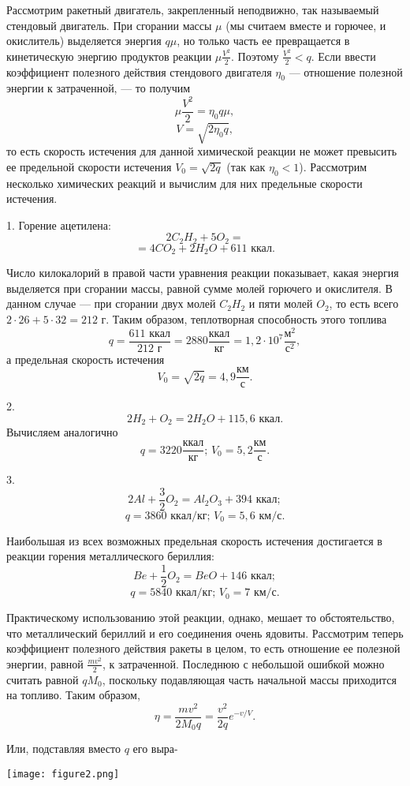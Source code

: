 \documentclass[twocolumn]{article}
\begin{document}
\begin{minipage}[t]{0.48\textwidth}
Рассмотрим ракетный двигатель, закрепленный неподвижно, так называемый стендовый двигатель. При сгорании массы $\mu$ (мы считаем вместе и горючее, и окислитель) выделяется энергия $q\mu$, но только часть ее превращается в кинетическую энергию продуктов реакции $\mu \frac{V^2}{2}$. Поэтому $\frac{V^2}{2} < q$. Если ввести коэффициент полезного действия стендового двигателя $\eta_0$ — отношение полезной энергии к затраченной, — то получим 
\[ \mu \frac{V^2}{2} = \eta_0 q\mu, \] 
\[ V = \sqrt{2\eta_0 q}, \] 
то есть скорость истечения для данной химической реакции не может превысить ее предельной скорости истечения $V_0 = \sqrt{2q}$ (так как $\eta_0 < 1$). Рассмотрим несколько химических реакций и вычислим для них предельные скорости истечения.

1. Горение ацетилена: 
\[ 2C_2H_2 + 5O_2 = \] 
\[ = 4CO_2 + 2H_2O + 611 \text{ ккал}. \]

Число килокалорий в правой части уравнения реакции показывает, какая энергия выделяется при сгорании массы, равной сумме молей горючего и окислителя. В данном случае — при сгорании двух молей $C_2H_2$ и пяти молей $O_2$, то есть всего $2 \cdot 26 + 5 \cdot 32 = 212 \text{ г}$. Таким образом, теплотворная способность этого топлива 
\[ q = \frac{611 \text{ ккал}}{212 \text{ г}} = 2880 \frac{\text{ккал}}{\text{кг}} = 1,2 \cdot 10^7 \frac{\text{м}^2}{\text{с}^2}, \] 
а предельная скорость истечения 
\[ V_0 = \sqrt{2q} = 4,9 \frac{\text{км}}{\text{с}}. \]
\end{minipage}
\hfill
\begin{minipage}[t]{0.48\textwidth}
2. 
\[ 2H_2 + O_2 = 2H_2O + 115,6 \text{ ккал}. \] 
Вычисляем аналогично 
\[ q = 3220 \frac{\text{ккал}}{\text{кг}}; \, V_0 = 5,2 \frac{\text{км}}{\text{с}}. \]

3. 
\[ 2Al + \frac{3}{2}O_2 = Al_2O_3 + 394 \text{ ккал}; \] 
\[ q = 3860 \text{ ккал/кг}; \, V_0 = 5,6 \text{ км/с}. \]

Наибольшая из всех возможных предельная скорость истечения достигается в реакции горения металлического бериллия: 
\[ Be + \frac{1}{2}O_2 = BeO + 146 \text{ ккал}; \] 
\[ q = 5840 \text{ ккал/кг}; \, V_0 = 7 \text{ км/с}. \]

Практическому использованию этой реакции, однако, мешает то обстоятельство, что металлический бериллий и его соединения очень ядовиты. Рассмотрим теперь коэффициент полезного действия ракеты в целом, то есть отношение ее полезной энергии, равной $\frac{mv^2}{2}$, к затраченной. Последнюю с небольшой ошибкой можно считать равной $qM_0$, поскольку подавляющая часть начальной массы приходится на топливо. Таким образом, 
\[ \eta = \frac{mv^2}{2M_0q} = \frac{v^2}{2q} e^{-v/V}. \]

Или, подставляя вместо $q$ его выра-

\begin{center}
\texttt{[image: figure2.png]} 
\end{center}
\end{minipage}
\end{document}

